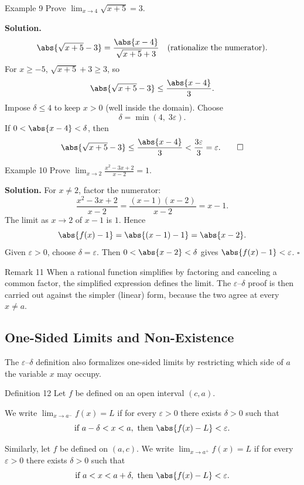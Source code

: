 \begin{examplebox}{Example 9}
Prove \(\displaystyle\lim_{x \to 4} \sqrt{x + 5} = 3\).

\medskip
\textbf{Solution.}
\[
\abs{\sqrt{x + 5} - 3}
= \frac{\abs{x - 4}}{\sqrt{x + 5} + 3}
\quad\text{(rationalize the numerator)}.
\]
For \(x \ge -5\), \(\sqrt{x + 5} + 3 \ge 3\), so
\[
\abs{\sqrt{x + 5} - 3} \le \frac{\abs{x - 4}}{3}.
\]
Impose \(\delta \le 4\) to keep \(x > 0\) (well inside the domain). Choose
\[
\delta = \min(4,\; 3\varepsilon).
\]
If \(0 < \abs{x - 4} < \delta\), then
\[
\abs{\sqrt{x + 5} - 3} \le \frac{\abs{x - 4}}{3} < \frac{3\varepsilon}{3} = \varepsilon.\qquad\square
\]
\end{examplebox}

\begin{examplebox}{Example 10}
Prove \(\displaystyle\lim_{x \to 2} \frac{x^{2} - 3x + 2}{x - 2} = 1\).

\medskip
\textbf{Solution.}
For \(x \ne 2\), factor the numerator:
\[
\frac{x^{2} - 3x + 2}{x - 2}
= \frac{(x - 1)(x - 2)}{x - 2}
= x - 1.
\]
The limit as \(x \to 2\) of \(x - 1\) is \(1\). Hence
\[
\abs{f(x) - 1} = \abs{(x - 1) - 1} = \abs{x - 2}.
\]
Given \(\varepsilon > 0\), choose \(\delta = \varepsilon\). Then \(0 < \abs{x - 2} < \delta\) gives \(\abs{f(x) - 1} < \varepsilon\). \(\square\)
\end{examplebox}

\begin{remarkbox}{Remark 11}
When a rational function simplifies by factoring and canceling a common factor, the simplified expression defines the limit. The \(\varepsilon\)--\(\delta\) proof is then carried out against the simpler (linear) form, because the two agree at every \(x \neq a\).
\end{remarkbox}

\subsection*{One-Sided Limits and Non-Existence}
\label{subsec:1.4.4}

The \(\varepsilon\)--\(\delta\) definition also formalizes one-sided limits by restricting which side of \(a\) the variable \(x\) may occupy.

\begin{definitionbox}{Definition 12}
Let \(f\) be defined on an open interval \((c, a)\).

We write \(\lim_{x \to a^{-}} f(x) = L\) if for every \(\varepsilon > 0\) there exists \(\delta > 0\) such that
\[
\text{if } a - \delta < x < a,\text{ then } \abs{f(x) - L} < \varepsilon.
\]

Similarly, let \(f\) be defined on \((a, c)\). We write \(\lim_{x \to a^{+}} f(x) = L\) if for every \(\varepsilon > 0\) there exists \(\delta > 0\) such that
\[
\text{if } a < x < a + \delta,\text{ then } \abs{f(x) - L} < \varepsilon.
\]
\end{definitionbox}

